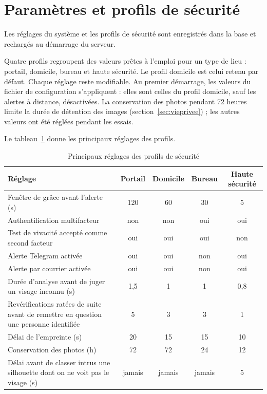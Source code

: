 \section{Paramètres et profils de sécurité}\label{sec:profils}

Les réglages du système et les profils de sécurité sont enregistrés dans la base et rechargés au démarrage du serveur. \begin{maj}
Quatre profils regroupent des valeurs prêtes à l'emploi pour un type de lieu : portail, domicile, bureau et haute sécurité. Le profil domicile est celui retenu par défaut. Chaque réglage reste modifiable. Au premier démarrage, les valeurs du fichier de configuration s'appliquent : elles sont celles du profil domicile, sauf les alertes à distance, désactivées. La conservation des photos pendant 72 heures limite la durée de détention des images (section~\ref{sec:vieprivee}) ; les autres valeurs ont été réglées pendant les essais.
\end{maj} Le tableau~\ref{tab:profils} donne les principaux réglages des profils.

\begin{table}[H]
\centering
\caption{Principaux réglages des profils de sécurité}\label{tab:profils}
\small
\begin{tabularx}{\textwidth}{@{}>{\raggedright\arraybackslash}Xcccc@{}}
\toprule
\textbf{Réglage} & \textbf{Portail} & \textbf{Domicile} & \textbf{Bureau} & \textbf{Haute sécurité} \\
\midrule
Fenêtre de grâce avant l'alerte (s) & 120 & 60 & 30 & 5 \\
Authentification multifacteur & non & non & oui & oui \\
Test de vivacité accepté comme second facteur & oui & oui & oui & non \\
Alerte Telegram activée & oui & oui & non & oui \\
Alerte par courrier activée & oui & oui & non & oui \\
Durée d'analyse avant de juger un visage inconnu (s) & 1,5 & 1 & 1 & 0,8 \\
Revérifications ratées de suite avant de remettre en question une personne identifiée & 5 & 3 & 3 & 1 \\
Délai de l'empreinte (s) & 20 & 15 & 15 & 10 \\
Conservation des photos (h) & 72 & 72 & 24 & 12 \\
Délai avant de classer intrus une silhouette dont on ne voit pas le visage (s) & jamais & jamais & jamais & 5 \\
\bottomrule
\end{tabularx}
\end{table}

